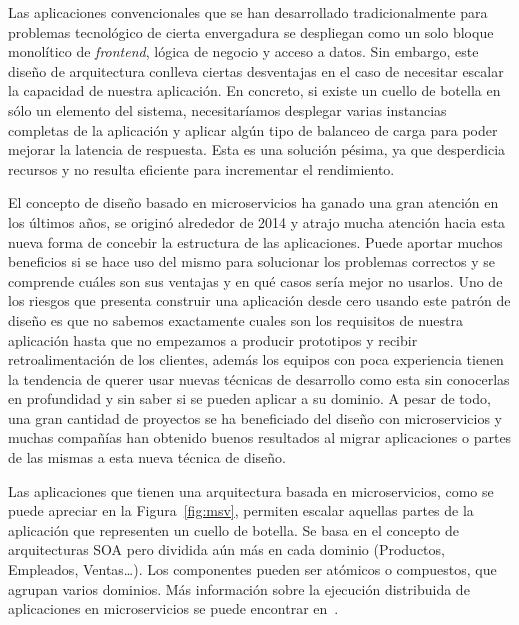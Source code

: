 Las aplicaciones convencionales que se han desarrollado tradicionalmente para problemas tecnológico de cierta envergadura se despliegan como un solo bloque monolítico de \textit{frontend}, lógica de negocio y acceso a datos. Sin embargo, este diseño de arquitectura conlleva ciertas desventajas en el caso de necesitar escalar la capacidad de nuestra aplicación. En concreto, si existe un cuello de botella en sólo un elemento del sistema, necesitaríamos desplegar varias instancias completas de la aplicación y aplicar algún tipo de balanceo de carga para poder mejorar la latencia de respuesta. Esta es una solución pésima, ya que desperdicia recursos y no resulta eficiente para incrementar el rendimiento.

El concepto de diseño basado en microservicios ha ganado una gran atención en los últimos años, se originó alrededor de 2014 y atrajo mucha atención hacia esta nueva forma de concebir la estructura de las aplicaciones. Puede aportar muchos beneficios si se hace uso del mismo para solucionar los problemas correctos y se comprende cuáles son sus ventajas y en qué casos sería mejor no usarlos. Uno de los riesgos que presenta construir una aplicación desde cero usando este patrón de diseño es que no sabemos exactamente cuales son los requisitos de nuestra aplicación hasta que no empezamos a producir prototipos y recibir retroalimentación de los clientes, además los equipos con poca experiencia tienen la tendencia de querer usar nuevas técnicas de desarrollo como esta sin conocerlas en profundidad y sin saber si se pueden aplicar a su dominio. A pesar de todo, una gran cantidad de proyectos se ha beneficiado del diseño con microservicios y muchas compañías han obtenido buenos resultados al migrar aplicaciones o partes de las mismas a esta nueva técnica de diseño. 

Las aplicaciones que tienen una arquitectura basada en microservicios, como se puede apreciar en la Figura~\ref{fig:msv}, permiten escalar aquellas partes de la aplicación que representen un cuello de botella. Se basa en el concepto de arquitecturas SOA pero dividida aún más en cada dominio (Productos, Empleados, Ventas…). Los componentes pueden ser atómicos o compuestos, que agrupan varios dominios. Más información sobre la ejecución distribuida de aplicaciones en microservicios se puede encontrar en~\cite{mservices}.

